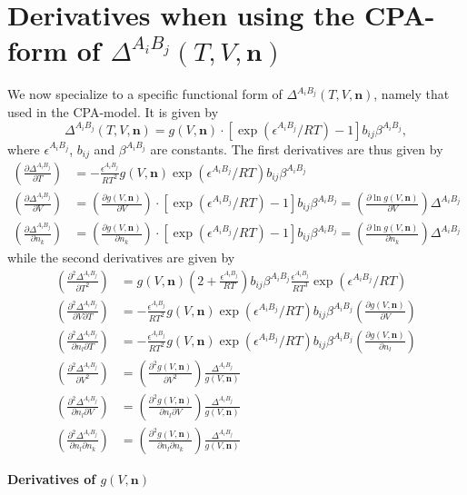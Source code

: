 \documentclass[english]{../thermomemo/thermomemo}
\newcommand{\mbf}[0]{\mathbf}
\newcommand*{\pder}[2]{\left(\frac{\partial #1}{\partial #2}\right)}
\newcommand*{\pdder}[2]{\left(\frac{\partial^2 #1}{\partial #2^2}\right)}
\newcommand*{\pdcross}[3]{\left(\frac{\partial^2 #1}{\partial #2 \partial #3}\right)}
\newcommand{\lp}{\left(}
\newcommand{\rp}{\right)}
\begin{document}
\section{Derivatives when using the CPA-form of $\Delta^{A_i B_j}(T,V,\mbf n)$}
We now specialize to a specific functional form of $\Delta^{A_i B_j}(T,V,\mbf n)$, namely that used in the CPA-model. It is given by
\begin{equation}
  \Delta^{A_i B_j}(T,V,\mbf n) = g(V,\mbf n) \cdot [\exp(\epsilon^{A_i B_j}/RT) - 1] b_{ij} \beta^{A_i B_j},
\end{equation}
where $\epsilon^{A_i B_j}$, $b_{ij}$ and $\beta^{A_i B_j}$ are constants. The first derivatives are thus given by
\begin{align}
  \pder{\Delta^{A_i B_j}}{T}   &= -\frac{\epsilon^{A_i B_j}}{RT^2} g(V,\mbf n) \exp(\epsilon^{A_i B_j}/RT) b_{ij} \beta^{A_i B_j} \\
  \pder{\Delta^{A_i B_j}}{V}   &= \pder{g(V,\mbf n)}{V} \cdot [\exp(\epsilon^{A_i B_j}/RT) - 1] b_{ij} \beta^{A_i B_j}  = \pder{\ln g(V,\mbf n)}{V} \Delta^{A_i B_j} \\
  \pder{\Delta^{A_i B_j}}{n_k} &= \pder{g(V,\mbf n)}{n_k} \cdot [\exp(\epsilon^{A_i B_j}/RT) - 1] b_{ij} \beta^{A_i B_j} =  \pder{\ln g(V,\mbf n)}{n_k} \Delta^{A_i B_j}
\end{align}
while the second derivatives are given by
\begin{align}
  \pdder{\Delta^{A_i B_j}}{T}   &=  g(V,\mbf n) \lp 2 + \frac{\epsilon^{A_i B_j}}{RT} \rp b_{ij} \beta^{A_i B_j} \frac{\epsilon^{A_i B_j}}{RT^3} \exp(\epsilon^{A_i B_j}/RT) \\
  \pdcross{\Delta^{A_i B_j}}{V}{T}   &= -\frac{\epsilon^{A_i B_j}}{RT^2} g(V,\mbf n) \exp(\epsilon^{A_i B_j}/RT) b_{ij} \beta^{A_i B_j} \pder{g(V,\mbf n)}{V} \\
  \pdcross{\Delta^{A_i B_j}}{n_l}{T}   &= -\frac{\epsilon^{A_i B_j}}{RT^2} g(V,\mbf n) \exp(\epsilon^{A_i B_j}/RT) b_{ij} \beta^{A_i B_j} \pder{g(V,\mbf n)}{n_l} \\
  \pdder{\Delta^{A_i B_j}}{V}   &= \pdder{g(V,\mbf n)}{V}  \frac{\Delta^{A_i B_j}}{g(V,\mbf n)} \\
  \pdcross{\Delta^{A_i B_j}}{n_l}{V}  &= \pdcross{g(V,\mbf n)}{n_l}{V} \frac{\Delta^{A_i B_j}}{g(V,\mbf n)} \\
  \pdcross{\Delta^{A_i B_j}}{n_l}{n_k}  &= \pdcross{g(V,\mbf n)}{n_l}{n_k} \frac{\Delta^{A_i B_j}}{g(V,\mbf n)} 
\end{align}

\textbf{Derivatives of $g(V,\mbf n)$}
\end{document}
